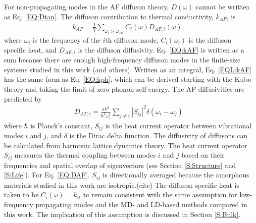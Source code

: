 \documentclass[aps,prb,twocolumn,superscriptaddress,footinbib,amsmath,amssymb,floatfix]{revtex4}
\begin{document}
For non-propagating modes in the AF diffuson theory, 
$D(\omega)$ cannot be written as Eq. \eqref{EQ:Dtau}.\cite{allen_thermal_1993}  
The diffuson contribution to thermal conductivity, $k_{AF}$, is
\cite{feldman_thermal_1993,feldman_numerical_1999}
\begin{equation}\label{EQ:kAF}
\begin{split}
k_{AF} = \frac{1}{V}\sum_{\omega_i>\omega_{cut}} C_i(\omega) D_{AF,i}(\omega), 
\end{split}
\end{equation}
where $\omega_i$ is the frequency of the $i$th diffuson mode, $C_i(\omega_i)$ 
is the diffuson specific heat, and $D_{AF,i}$ is the diffuson diffusivity.
Eq. \eqref{EQ:kAF} is written as a sum because there are enough high-frequency 
diffuson modes in the finite-size systems studied in this work (and others).
\cite{feldman_thermal_1993,feldman_numerical_1999} 
Written as an integral, Eq. \eqref{EQL:kAF} has the same form as 
Eq. \ref{EQ:kph}, which can be derived starting 
with the Kubo theory
\cite{flicker_lattice_1973,allen_thermal_1993,alam_lattice_2005,
baldi_thermal_2008,yang_anomalously_2010}  
and taking the limit 
of zero phonon self-energy.\cite{baldi_thermal_2008} 
The AF diffusivities are predicted by\cite{allen_thermal_1993} 
\begin{equation}\label{EQ:DAF}
\begin{split}
D_{AF,i} = \frac{\pi V^2}{\hbar^2\omega^2_i}\sum_{j\neq i}
|S_{ij}|^2 \delta(\omega_i - \omega_j)
\end{split}
\end{equation}
where $\hbar$ is Planck's constant, $S_{ij}$ is the heat current operator 
between vibrational modes $i$ and $j$, and $\delta$ is the Dirac delta 
function. The diffusivity of diffusons 
can be calculated from harmonic lattice dynamics theory.
\cite{allen_thermal_1993,feldman_thermal_1993,feldman_numerical_1999} 
The heat current operator $S_{ij}$ measures the thermal 
coupling between modes $i$ and $j$ based on their frequencies and 
spatial overlap of eigenvectors 
(see Section \ref{S:Structure} and \ref{S:Life}). 
For Eq. \eqref{EQ:DAF}, $S_{ij}$ is directionally averaged because 
the amorphous materials studied in this work are isotropic.(cite) 
The diffuson specific heat is taken to be $C_i(\omega) = k_{\text{B}}$ 
to remain consistent with the same assumption for low-frequency propagating 
modes and the MD- and LD-based methods compared in this work. 
The implication of this assumption is discussed in Section \ref{S:Bulk}.
\end{document}
